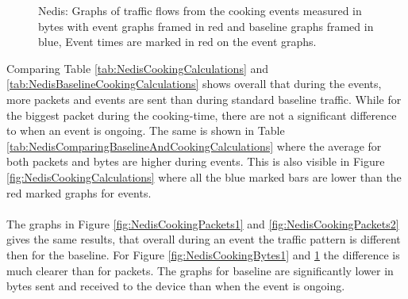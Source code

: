 \begin{figure}[H]
\begin{subfigure}[b]{0.47\textwidth}
    \end{subfigure}
        \begin{subfigure}[b]{0.47\textwidth}
        \centering
    \end{subfigure}
    \begin{subfigure}[b]{0.47\textwidth}
        \centering
    \end{subfigure}
    \begin{subfigure}[b]{0.47\textwidth}
        \centering
    \end{subfigure}
    \hspace{0.6cm}
    \begin{subfigure}[b]{0.47\textwidth}
    \centering
        \end{subfigure}
    \caption{Nedis: Graphs of traffic flows from the cooking events measured in bytes with event graphs framed in red and baseline graphs framed in blue, Event times are marked in red on the event graphs.} 
    \label{fig:NedisCookingBytes2}
\end{figure}

Comparing Table \ref{tab:NedisCookingCalculations} and \ref{tab:NedisBaselineCookingCalculations} shows overall that during the events, more packets and events are sent than during standard baseline traffic. While for the biggest packet during the cooking-time, there are not a significant difference to when an event is ongoing. The same is shown in Table \ref{tab:NedisComparingBaselineAndCookingCalculations} where the average for both packets and bytes are higher during events. This is also visible in Figure \ref{fig:NedisCookingCalculations} where all the blue marked bars are lower than the red marked graphs for events. 
\\\\
The graphs in Figure \ref{fig:NedisCookingPackets1} and \ref{fig:NedisCookingPackets2} gives the same results, that overall during an event the traffic pattern is different then for the baseline. For Figure \ref{fig:NedisCookingBytes1} and \ref{fig:NedisCookingBytes2} the difference is much clearer than for packets. The graphs for baseline are significantly lower in bytes sent and received to the device than when the event is ongoing. 

